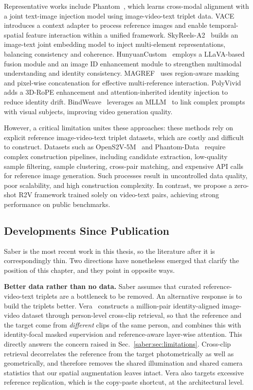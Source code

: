 Representative works include Phantom~\citep{liu2025phantom}, which learns cross-modal alignment with a joint text-image injection model using image-video-text triplet data.
VACE~\citep{jiang2025vace} introduces a context adapter to process reference images and enable temporal-spatial feature interaction within a unified framework.
SkyReels-A2~\citep{fei2025skyreels} builds an image-text joint embedding model to inject multi-element representations, balancing consistency and coherence.
HunyuanCustom~\citep{hu2025hunyuancustom} employs a LLaVA-based~\citep{liu2023visual} fusion module and an image ID enhancement module to strengthen multimodal understanding and identity consistency.
MAGREF~\citep{deng2025magref} uses region-aware masking and pixel-wise concatenation for effective multi-reference interaction.
PolyVivid~\citep{hu2025polyvivid} adds a 3D-RoPE enhancement and attention-inherited identity injection to reduce identity drift.
BindWeave~\citep{li2025bindweave} leverages an MLLM~\citep{bai2025qwen2} to link complex prompts with visual subjects, improving video generation quality.

However, a critical limitation unites these approaches: these methods rely on explicit reference image-video-text triplet datasets, which are costly and difficult to construct.
Datasets such as OpenS2V-5M~\citep{yuan2025opens2v} and Phantom-Data~\citep{chen2025phantom} require complex construction pipelines, including candidate extraction, low-quality sample filtering, sample clustering, cross-pair matching, and expensive API calls for reference image generation.
Such processes result in uncontrolled data quality, poor scalability, and high construction complexity.
In contrast, we propose a zero-shot R2V framework trained solely on video-text pairs, achieving strong performance on public benchmarks.


\subsection{Developments Since Publication}
\label{saber:sec:post_publication}
Saber is the most recent work in this thesis, so the literature after it is correspondingly thin. Two directions have nonetheless emerged that clarify the position of this chapter, and they point in opposite ways.

\noindent \textbf{Better data rather than no data.}
Saber assumes that curated reference-video-text triplets are a bottleneck to be removed. An alternative response is to build the triplets better. Vera~\citep{xu2026vera} constructs a million-pair identity-aligned image-video dataset through person-level cross-clip retrieval, so that the reference and the target come from \emph{different} clips of the same person, and combines this with identity-focal masked supervision and reference-aware layer-wise attention. This directly answers the concern raised in Sec.~\ref{saber:sec:limitations}. Cross-clip retrieval decorrelates the reference from the target photometrically as well as geometrically, and therefore removes the shared illumination and shared camera statistics that our spatial augmentation leaves intact. Vera also targets excessive reference replication, which is the copy-paste shortcut, at the architectural level.

